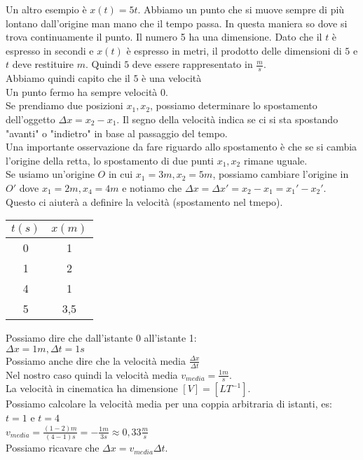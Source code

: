 \documentclass{article}
\begin{document}
Un altro esempio \`{e} $x(t)=5t$. Abbiamo un punto che si muove sempre di pi\`{u}
lontano dall'origine man mano che il tempo passa. In questa maniera so dove si trova 
continuamente il punto. Il numero 5 ha una dimensione. Dato che il $t$ \`{e}
espresso in secondi e $x(t)$ \`{e} espresso in metri, il prodotto delle dimensioni
di $5$ e $t$ deve restituire $m$. Quindi $5$ deve essere rappresentato in $\frac{m}{s}$.\\
Abbiamo quindi capito che il $5$ \`{e} una velocit\`{a}\\
Un punto fermo ha sempre velocit\`{a} 0.\\
Se prendiamo due posizioni $x_1, x_2$, possiamo determinare lo spostamento dell'oggetto
$\Delta x=x_2-x_1$. Il segno della velocit\`{a} indica se ci si sta spostando "avanti"
o "indietro" in base al passaggio del tempo.\\
Una importante osservazione da fare riguardo allo spostamento \`{e} 
che se si cambia l'origine della retta, lo spostamento di due punti $x_1, x_2$ rimane uguale.\\
Se usiamo un'origine $O$ in cui $x_1=3 m, x_2=5 m$, possiamo cambiare l'origine 
in $O'$ dove $x_1= 2m, x_4 = 4m$ e notiamo che $\Delta x= \Delta x' = x_2-x_1 = x_1'-x_2'$.\\
Questo ci aiuter\`{a} a definire la velocit\`{a} (spostamento nel tmepo).\\
\begin{tabular} {c | c}
    $t(s)$ & $x(m)$\\
    \hline
    0 & 1\\
    1 & 2\\
    4 & 1\\
    5 & 3,5
\end{tabular}
Possiamo dire che dall'istante 0 all'istante 1:\\
$\Delta x=1m, \Delta t=1s$\\
Possiamo anche dire che la velocit\`{a} media $\frac{\Delta x}{\Delta t}$\\
Nel nostro caso quindi la velocit\`{a} media $v_{media}=\frac{1m}{s}$.\\
La velocit\`{a} in cinematica ha dimensione $[V]=[LT^{-1}]$.\\
Possiamo calcolare la velocit\`{a} media per una coppia arbitraria di istanti, es:\\
$t=1$ e $t=4$\\
$v_{media}=\frac{(1-2)m}{(4-1)s}=-\frac{1m}{3s}\approx 0,33\frac{m}{s}$\\
Possiamo ricavare che $\Delta x = v_{media}\Delta t$.\\
\end{document}
